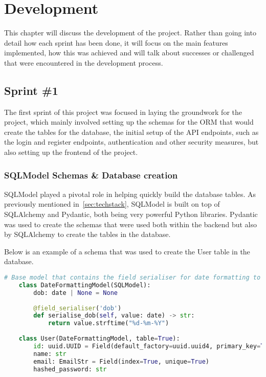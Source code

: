 \chapter{Development}\label{ch:development}

This chapter will discuss the development of the project. Rather than going into detail how each sprint has been done, it will focus on the main features implemented, how this was achieved and will talk about successes or challenged that were encountered in the development process.

\section{Sprint \#1}

The first sprint of this project was focused in laying the groundwork for the project, which mainly involved setting up the schemas for the ORM that would create the tables for the database, the initial setup of the API endpoints, such as the login and register endpoints, authentication and other security measures, but also setting up the frontend of the project.

\subsection{SQLModel Schemas \& Database creation}

SQLModel played a pivotal role in helping quickly build the database tables. As previously mentioned in~\ref{sec:techstack}, SQLModel is built on top of SQLAlchemy and Pydantic, both being very powerful Python libraries. Pydantic was used to create the schemas that were used both within the backend but also by SQLAlchemy to create the tables in the database. 

Below is an example of a schema that was used to create the User table in the database.

\begin{lstlisting}[language=Python, caption=SQLModel User Schema]
# Base model that contains the field serialiser for date formatting to dd-mm-yyyy and the date field itself
    class DateFormattingModel(SQLModel):
        dob: date | None = None
    
        @field_serialiser('dob')
        def serialise_dob(self, value: date) -> str:
            return value.strftime("%d-%m-%Y")
    
    class User(DateFormattingModel, table=True):
        id: uuid.UUID = Field(default_factory=uuid.uuid4, primary_key=True)
        name: str
        email: EmailStr = Field(index=True, unique=True)
        hashed_password: str
\end{lstlisting}

